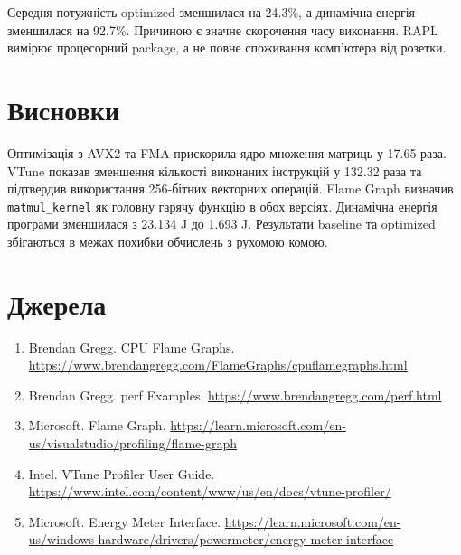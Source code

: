 \documentclass[12pt,a4paper]{article}
\begin{document}
Середня потужність optimized зменшилася на 24.3\%, а динамічна енергія зменшилася на 92.7\%. Причиною є значне скорочення часу виконання. RAPL вимірює процесорний package, а не повне споживання комп'ютера від розетки.

\section{Висновки}

Оптимізація з AVX2 та FMA прискорила ядро множення матриць у 17.65 раза. VTune показав зменшення кількості виконаних інструкцій у 132.32 раза та підтвердив використання 256-бітних векторних операцій. Flame Graph визначив \texttt{matmul\_kernel} як головну гарячу функцію в обох версіях. Динамічна енергія програми зменшилася з 23.134 J до 1.693 J. Результати baseline та optimized збігаються в межах похибки обчислень з рухомою комою.

\section{Джерела}

\begin{enumerate}
\item Brendan Gregg. CPU Flame Graphs. \url{https://www.brendangregg.com/FlameGraphs/cpuflamegraphs.html}
\item Brendan Gregg. perf Examples. \url{https://www.brendangregg.com/perf.html}
\item Microsoft. Flame Graph. \url{https://learn.microsoft.com/en-us/visualstudio/profiling/flame-graph}
\item Intel. VTune Profiler User Guide. \url{https://www.intel.com/content/www/us/en/docs/vtune-profiler/}
\item Microsoft. Energy Meter Interface. \url{https://learn.microsoft.com/en-us/windows-hardware/drivers/powermeter/energy-meter-interface}
\end{enumerate}
\end{document}
